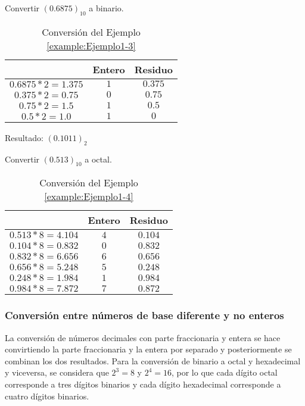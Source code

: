 \begin{exampleT}{\rm
    Convertir $(0.6875)_{10}$ a binario.
    \begin{table}[!h]
    \centering
	\begin{tabular}{ccc}
	  \toprule
	     & \textbf{Entero} & \textbf{Residuo} \\
	     \midrule
	    $0.6875*2=1.375$ 	& $1$	& $0.375$\\
	    $0.375*2=0.75$	& $0$	& $0.75 $\\
	    $0.75*2=1.5$	& $1$	& $0.5$\\
	    $0.5*2=1.0$		& $1$	& $0$\\
	  \bottomrule
	\end{tabular}
	\caption{Conversión del Ejemplo \ref{example:Ejemplo1-3}}
	\label{table:Ejemplo1-3}
    \end{table}    
  Resultado: $(0.1011)_{2}$
  \label{example:Ejemplo1-3}
}\end{exampleT}

\begin{exampleT}{\rm
    Convertir $(0.513)_{10}$ a octal.
	\begin{table}[!h]
		\centering
    \begin{tabular}{ccc}
      \toprule
       & \textbf{Entero} & \textbf{Residuo} \\
       \midrule
	$0.513 * 8 = 4.104$ 	& $4$	& $0.104$\\
	$0.104 * 8 = 0.832$	& $0$	& $0.832$\\
	$0.832 * 8 = 6.656$	& $6$	& $0.656$\\
	$0.656 * 8 = 5.248$	& $5$	& $0.248$\\
	$0.248 * 8 = 1.984$ 	& $1$ 	& $0.984$\\
	$0.984 * 8 = 7.872$ 	& $7$ 	& $0.872$\\
      \bottomrule
    \end{tabular}  
    \caption{Conversión del Ejemplo \ref{example:Ejemplo1-4}}
    \label{table:Ejemplo1-4}
    	\end{table}
  \label{example:Ejemplo1-4}
}\end{exampleT}

  
\subsubsection{Conversión entre números de base diferente y no enteros}

  La conversión de números decimales con parte fraccionaria y entera se hace convirtiendo la parte fraccionaria y la entera por separado y posteriormente se combinan los dos resultados.
  Para la conversión de binario a octal y hexadecimal y viceversa, se considera que $2^{3} = 8$ y $2^{4} = 16$, por lo que cada dígito octal corresponde a tres dígitos binarios y cada 
  dígito hexadecimal corresponde a cuatro dígitos binarios.  


